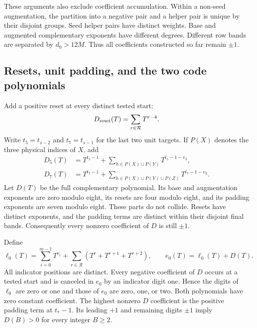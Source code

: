 These arguments also exclude coefficient accumulation. Within a
non-seed augmentation, the partition into a negative pair and a
helper pair is unique by their disjoint groups. Seed helper pairs
have distinct weights. Base and augmented complementary exponents
have different degrees. Different row bands are separated by
$d_0>12M$. Thus all coefficients constructed so far remain $\pm1$.

\subsection{Resets, unit padding, and the two code polynomials}

Add a positive reset at every distinct tested start:
\begin{equation}\label{eq:product-bound-resets}
 D_{\rm reset}(T)=\sum_{r\in\mathcal R}T^{r-4}.
\end{equation}
Write $t_5=t_{s-2}$ and $t_7=t_{s-1}$ for the last two unit targets.
If $P(X)$ denotes the three physical indices of $X$, add
\begin{equation}\label{eq:product-bound-pads}
\begin{aligned}
 D_5(T)&=T^{t_5-1}
   +\sum_{h\in P(X)\cup P(Y)}T^{t_5-1-v_h},\\
 D_7(T)&=T^{t_7-1}
   +\sum_{h\in P(X)\cup P(Y)\cup P(Z)}T^{t_7-1-v_h}.
\end{aligned}
\end{equation}
Let $D(T)$ be the full complementary polynomial. Its base and
augmentation exponents are zero modulo eight, its resets are four
modulo eight, and its padding exponents are seven modulo eight.
These parts do not collide. Resets have distinct exponents, and the
padding terms are distinct within their disjoint final bands.
Consequently every nonzero coefficient of $D$ is still $\pm1$.

Define
\begin{equation}\label{eq:product-bound-codes}
 \ell_0(T)=\sum_{i=0}^{m-1}T^{v_i}
        +\sum_{r\in\mathcal R}(T^r+T^{r+1}+T^{r+2}),
 \qquad e_0(T)=\ell_0(T)+D(T).
\end{equation}
All indicator positions are distinct. Every negative coefficient of
$D$ occurs at a tested start and is canceled in $e_0$ by an indicator
digit one. Hence the digits of $\ell_0$ are zero or one and those of
$e_0$ are zero, one, or two. Both polynomials have zero constant
coefficient. The highest nonzero $D$ coefficient is the positive
padding term at $t_*-1$. Its leading $+1$ and remaining digits
$\pm1$ imply $D(B)>0$ for every integer $B\ge2$.

